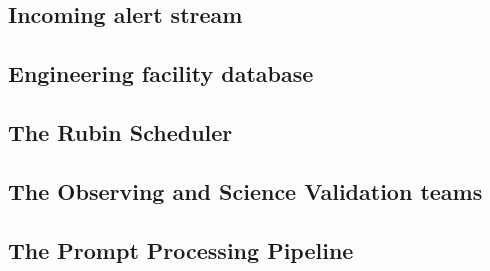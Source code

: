 \subsection{Incoming alert stream}\label{subsec:alertStream}

\subsection{Engineering facility database}\label{subsec:EFD}

\subsection{The Rubin Scheduler}\label{subsec:Scheduler}

\subsection{The Observing and Science Validation teams}\label{subsec:ObsSVTeams}

\subsection{The Prompt Processing Pipeline}\label{subsec:PP}